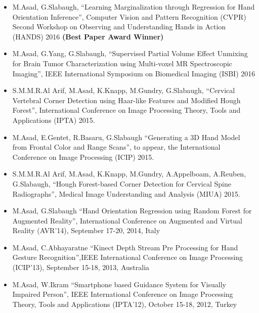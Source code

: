 \documentclass[letterpaper,11pt]{article}
\begin{document}
\begin{itemize}
	\item{\footnotesize M.Asad, G.Slabaugh, ``Learning Marginalization through Regression for Hand Orientation Inference'', Computer Vision and Pattern Recognition (CVPR) Second Workshop on Observing and Understanding Hands in Action (HANDS) 2016 \textbf{(Best Paper Award Winner)}}
	\item{\footnotesize M.Asad, G.Yang, G.Slabaugh, ``Supervised Partial Volume Effect Unmixing for Brain Tumor Characterization using Multi-voxel MR Spectroscopic Imaging'', IEEE International Symposium on Biomedical Imaging (ISBI) 2016}
	\item{\footnotesize S.M.M.R.Al Arif, M.Asad, K.Knapp, M.Gundry, G.Slabaugh, ``Cervical Vertebral Corner Detection using Haar-like Features and Modified Hough Forest'', International Conference on Image Processing Theory, Tools and Applications (IPTA) 2015.}
	\item{\footnotesize M.Asad, E.Gentet, R.Basaru, G.Slabaugh ``Generating a 3D Hand Model from Frontal Color and Range Scans'', to appear, the International Conference on Image Processing (ICIP) 2015.}
	\item{\footnotesize S.M.M.R.Al Arif, M.Asad, K.Knapp, M.Gundry, A.Appelboam, A.Reuben, G.Slabaugh, ``Hough Forest-based Corner Detection for Cervical Spine Radiographs'', Medical Image Understanding and Analysis (MIUA) 2015. }
	\item{\footnotesize M.Asad, G.Slabaugh ``Hand Orientation Regression using Random Forest for Augmented Reality'', International Conference on Augmented and Virtual Reality (AVR'14),  September 17-20, 2014, Italy }
	\item{\footnotesize M.Asad, C.Abhayaratne ``Kinect Depth Stream Pre Processing for Hand Gesture Recognition'',IEEE International Conference on Image Processing (ICIP'13), September 15-18, 2013, Australia }
	\item{\footnotesize M.Asad, W.Ikram ``Smartphone based Guidance System for Visually Impaired Person'', IEEE International Conference on Image Processing Theory, Tools and Applications (IPTA'12),  October 15-18, 2012, Turkey }
	
\end{itemize} 

\end{document}

